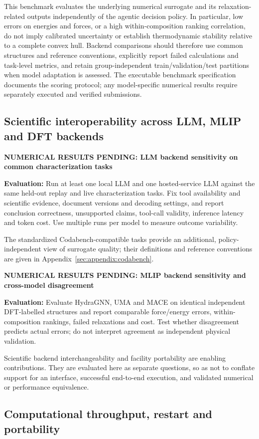 \documentclass[11pt,a4paper]{article}
\newcommand{\newexperiment}[2]{\par\medskip\noindent\begingroup\color{red!80!black}\textbf{NUMERICAL RESULTS PENDING: #1}\par\noindent\textbf{Evaluation:} #2\par\endgroup\medskip}
\begin{document}
This benchmark evaluates the underlying numerical surrogate and its
relaxation-related outputs independently of the agentic decision policy.
In particular, low errors on energies and forces, or a high within-composition
ranking correlation, do not imply calibrated uncertainty or establish
thermodynamic stability relative to a complete convex hull.
Backend comparisons should therefore use common structures and
reference conventions, explicitly report failed calculations and
task-level metrics, and retain group-independent train/validation/test
partitions when model adaptation is assessed. The executable benchmark
specification documents the scoring protocol; any model-specific numerical
results require separately executed and verified submissions.

\subsection{Scientific interoperability across LLM, MLIP and DFT backends}
\label{sec:results_interoperability}
\newexperiment{LLM backend sensitivity on common characterization tasks}{Run at least one local LLM and one hosted-service LLM against the same held-out replay and live characterization tasks. Fix tool availability and scientific evidence, document versions and decoding settings, and report conclusion correctness, unsupported claims, tool-call validity, inference latency and token cost. Use multiple runs per model to measure outcome variability.}
The standardized Codabench-compatible tasks provide an additional, policy-independent view of surrogate quality; their definitions and reference conventions are given in Appendix~\ref{sec:appendix:codabench}.
\newexperiment{MLIP backend sensitivity and cross-model disagreement}{Evaluate HydraGNN, UMA and MACE on identical independent DFT-labelled structures and report comparable force/energy errors, within-composition rankings, failed relaxations and cost. Test whether disagreement predicts actual errors; do not interpret agreement as independent physical validation.}
\label{sec:systems_results}
Scientific backend interchangeability and facility portability are enabling contributions. They are evaluated here as separate questions, so as not to conflate support for an interface, successful end-to-end execution, and validated numerical or performance equivalence.
\subsection{Computational throughput, restart and portability}
\label{sec:results_reliability}
\end{document}
